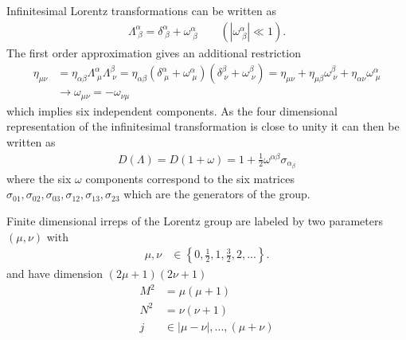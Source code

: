 \documentclass[10pt,a4paper]{book}
\theoremstyle{definition}
\begin{document}
Infinitesimal Lorentz transformations can be written as
\begin{align}
    \Lambda^\alpha_{\;\beta}=\delta^\alpha_{\;\beta}+\omega^\alpha_{\;\beta}\qquad(|\omega^\alpha_{\;\beta}|\ll 1).
\end{align}
The first order approximation gives an additional restriction
\begin{align}
    \eta_{\mu\nu} &= \eta_{\alpha\beta}\Lambda^\alpha_{\;\mu}\Lambda^\beta_{\;\nu}=\eta_{\alpha\beta}(\delta^\alpha_{\;\mu}+\omega^\alpha_{\;\mu})(\delta^\beta_{\;\nu}+\omega^\beta_{\;\nu})=\eta_{\mu\nu}+\eta_{\mu\beta}\omega^\beta_{\;\nu}+\eta_{\alpha\nu}\omega^\alpha_{\;\mu}\\
    &\rightarrow \omega_{\mu\nu}=-\omega_{\nu\mu}
\end{align}
which implies six independent components. As the four dimensional representation of the infinitesimal transformation is close to unity it can then be written as
\begin{align}
    D(\Lambda)=D(1+\omega)=1+\frac{1}{2}\omega^{\alpha\beta}\sigma_{\alpha_\beta}
\end{align}
where the six $\omega$ components correspond to the six matrices $\sigma_{01},\sigma_{02},\sigma_{03},\sigma_{12},\sigma_{13},\sigma_{23}$ which are the generators of the group.


Finite dimensional irreps of the Lorentz group are labeled by two parameters $(\mu,\nu)$ with
\begin{align}
    \mu,\nu &\in \left\{0,\frac{1}{2},1,\frac{3}{2},2,...\right\}.
\end{align}
and have dimension $(2\mu+1)(2\nu+1)$
\begin{align*}
    M^2&=\mu(\mu+1)\\
    N^2&=\nu(\nu+1)\\
    j  &\in |\mu-\nu|, ..., (\mu+\nu)
\end{align*}
\end{document}
